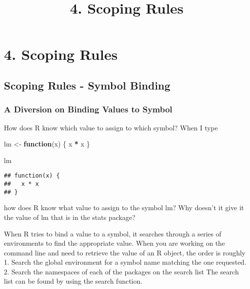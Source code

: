 \documentclass[
]{article}
\title{4. Scoping Rules}
\author{}
\date{\vspace{-2.5em}}
\newenvironment{Shaded}{\begin{snugshade}}{\end{snugshade}}
\newcommand{\ControlFlowTok}[1]{\textcolor[rgb]{0.13,0.29,0.53}{\textbf{#1}}}
\newcommand{\NormalTok}[1]{#1}
\newcommand{\OtherTok}[1]{\textcolor[rgb]{0.56,0.35,0.01}{#1}}
\newcommand{\SpecialCharTok}[1]{\textcolor[rgb]{0.81,0.36,0.00}{\textbf{#1}}}
\begin{document}
\maketitle

\hypertarget{scoping-rules}{%
\section{4. Scoping Rules}\label{scoping-rules}}

\hypertarget{scoping-rules---symbol-binding}{%
\subsection{Scoping Rules - Symbol
Binding}\label{scoping-rules---symbol-binding}}

\hypertarget{a-diversion-on-binding-values-to-symbol}{%
\subsubsection{A Diversion on Binding Values to
Symbol}\label{a-diversion-on-binding-values-to-symbol}}

How does R know which value to assign to which symbol? When I type

\begin{Shaded}
\begin{Highlighting}[]
\NormalTok{lm }\OtherTok{\textless{}{-}} \ControlFlowTok{function}\NormalTok{(x) \{}
\NormalTok{  x }\SpecialCharTok{*}\NormalTok{ x}
\NormalTok{\}}

\NormalTok{lm}
\end{Highlighting}
\end{Shaded}

\begin{verbatim}
## function(x) {
##   x * x
## }
\end{verbatim}

how does R know what value to assign to the symbol lm? Why doesn't it
give it the value of lm that is in the stats package?

When R tries to bind a value to a symbol, it searches through a series
of environments to find the appropriate value. When you are working on
the command line and need to retrieve the value of an R object, the
order is roughly 1. Search the global environment for a symbol name
matching the one requested.\\
2. Search the namespaces of each of the packages on the search list The
search list can be found by using the search function.
\end{document}

